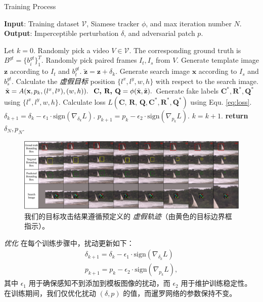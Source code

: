 \begin{algorithm}[tb]
\caption{Training Process}
\label{alg:algorithm}
\textbf{Input}: Training dataset $\mathcal{V}$, Siamese tracker $\phi$, and max iteration number $N$.\\
\textbf{Output}: Imperceptible perturbation $\delta$, and adversarial patch $p$.
\begin{algorithmic}[1] %
\State Let $k = 0$.
\State Randomly pick a video $V\in \mathcal{V}$. The corresponding ground truth is $B^{gt}=\{b^{gt}_i\}^T_1$.
\State Randomly pick paired frames $I_t, I_s$ from $V$.
\State Generate template image $\textbf{z}$ according to $I_t$ and $b^{gt}_t$.
\State $\tilde{\textbf{z}} = \textbf{z} + \delta_k.$
\State Generate search image $\textbf{x}$ according to $I_s$ and $b^{gt}_s$.
\State Calculate the \textit{虚假目标} position $\{l^x, l^y, w, h\}$ with respect to the search image.
\State $\tilde{\textbf x} = A(\textbf x, p_k, (l^x, l^y), (w, h)).$
\State $\textbf{C, R, Q} = \phi(\tilde {\textbf x}, \tilde{\textbf z}).$
\State Generate fake labels $\textbf{C}^*,\textbf{R}^*,\textbf{Q}^*$ using $\{l^x, l^y, w, h\}$.
\State Calculate loss $L(\textbf{C, R, Q}, \textbf{C}^*, \textbf{R}^*, \textbf{Q}^*)$ using Equ. \ref{eq:loss}.
\State $\delta_{k+1} = \delta_{k} - \epsilon_1 \cdot \text{sign}(\nabla_{\delta_k}L).$
\State $p_{k+1} = p_{k} - \epsilon_2 \cdot \text{sign}(\nabla_{p_k}L).$
\State $k = k + 1.$
\EndWhile
\State \textbf{return} $\delta_N, p_N.$
\end{algorithmic}
\label{alg}
\end{algorithm}

\begin{figure}[t]
\centering
\includegraphics[width=1.0\textwidth]{Img/attack/vis_v4.pdf}
\caption{我们的目标攻击结果遵循预定义的 \textit{虚假轨迹}（由黄色的目标边界框指示）。}
\label{fig:vis}
\end{figure}

\textit{优化} 在每个训练步骤中，扰动更新如下：
\begin{gather}
\delta_{k+1} = \delta_{k} - \epsilon_1 \cdot \text{sign}(\nabla_{\delta_k}L)\\
p_{k+1} = p_{k} - \epsilon_2 \cdot \text{sign}(\nabla_{p_k}L),
\end{gather}
其中 $\epsilon_1$ 用于确保感知不到添加到模板图像的扰动，而 $\epsilon_2$ 用于维护训练稳定性。
在训练期间，我们仅优化扰动 $(\delta, p)$ 的值，而暹罗网络的参数保持不变。

